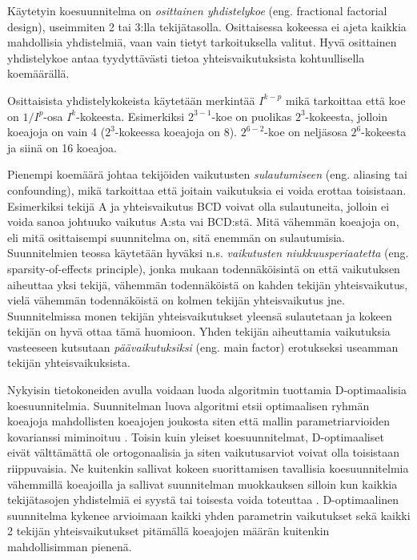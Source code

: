 \documentclass[12pt,a4paper,finnish]{tutthesis}
\begin{document}
Käytetyin koesuunnitelma on \textit{osittainen yhdistelykoe} (eng. fractional factorial
design), useimmiten 2 tai 3:lla tekijätasolla. Osittaisessa kokeessa ei ajeta
kaikkia mahdollisia yhdistelmiä, vaan vain tietyt tarkoituksella valitut. Hyvä
osittainen yhdistelykoe antaa tyydyttävästi tietoa yhteisvaikutuksista
kohtuullisella koemäärällä.

Osittaisista yhdistelykokeista käytetään merkintää \(I^{k - p}\)
mikä tarkoittaa että koe on \(1/I^p\)-osa \(I^k\)-kokeesta.
Esimerkiksi \(2^{3 - 1}\)-koe on puolikas \(2^3\)-kokeesta,
jolloin koeajoja on vain 4 (\(2^3\)-kokeessa koeajoja on 8).
\(2^{6-2}\)-koe on neljäsosa \(2^6\)-kokeesta
ja siinä on 16 koeajoa.

Pienempi koemäärä johtaa tekijöiden vaikutusten
\textit{sulautumiseen}
(eng. aliasing tai confounding), mikä tarkoittaa että joitain
vaikutuksia ei voida erottaa toisistaan. Esimerkiksi tekijä A ja yhteisvaikutus BCD
voivat olla sulautuneita, jolloin ei voida sanoa johtuuko vaikutus A:sta vai
BCD:stä. Mitä vähemmän koeajoja on, eli mitä osittaisempi suunnitelma on, sitä
enemmän on sulautumisia. Suunnitelmien teossa käytetään hyväksi n.s.
\textit{vaikutusten niukkuusperiaatetta} (eng. sparsity-of-effects principle),
jonka mukaan todennäköisintä on että vaikutuksen aiheuttaa yksi tekijä, vähemmän
todennäköistä on kahden tekijän yhteisvaikutus, vielä vähemmän todennäköistä on
kolmen tekijän yhteisvaikutus jne.
Suunnitelmissa monen tekijän yhteisvaikutukset
yleensä sulautetaan ja kokeen tekijän on hyvä ottaa tämä huomioon.
Yhden tekijän aiheuttamia vaikutuksia vasteeseen kutsutaan \textit{päävaikutuksiksi}
(eng. main factor) erotukseksi useamman tekijän yhteisvaikuksista.

Nykyisin tietokoneiden avulla voidaan luoda algoritmin tuottamia D-optimaalisia
koesuunnitelmia. Suunnitelman luova algoritmi etsii optimaalisen ryhmän
koeajoja mahdollisten koeajojen joukosta siten että mallin parametriarvioiden
kovarianssi miminoituu \parencite[s.~513]{Montgomery2012}.
Toisin kuin yleiset koesuunnitelmat, D-optimaaliset eivät välttämättä ole
ortogonaalisia ja siten vaikutusarviot voivat olla toisistaan riippuvaisia.
Ne kuitenkin sallivat kokeen suorittamisen tavallisia koesuunnitelmia
vähemmillä koeajoilla ja sallivat suunnitelman muokkauksen silloin kun
kaikkia tekijätasojen yhdistelmiä ei syystä tai toisesta voida toteuttaa
\parencite{ehandbook,mitchell1974}.
D-optimaalinen suunnitelma kykenee arvioimaan kaikki yhden parametrin vaikutukset sekä kaikki 2 tekijän yhteisvaikutukset pitämällä koeajojen määrän kuitenkin mahdollisimman pienenä.
\end{document}
